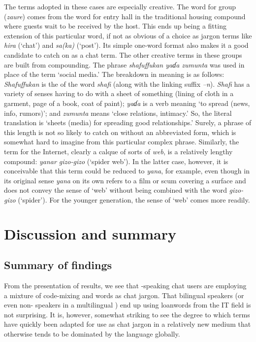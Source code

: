 \documentclass[output=paper,newtxmath,modfonts,nonflat,hidelinks]{langsci/langscibook}
\begin{document}
The  terms adopted in these cases are especially creative. The word for group (\textit{zaure}) comes from the word for entry hall in the traditional  housing compound where guests wait to be received by the host. This ends up being a fitting extension of this particular word, if not as obvious of a choice as jargon terms like \textit{hira} (‘chat’) and \textit{sa(ka)} (‘post’). Its simple one-word format also makes it a good candidate to catch on as a chat term. The other creative  terms in these groups are built from compounding. The phrase \textit{shafuffukan yaɗa zumunta} was used in place of the term ‘social media.’ The breakdown in meaning is as follows: \textit{Shafuffukan} is the  of the word \textit{shafi} (along with the linking suffix \textit{–n}). \textit{Shafi} has a variety of senses having to do with a sheet of something (lining of cloth in a garment, page of a book, coat of paint); \textit{yaɗa} is a verb meaning ‘to spread (news, info, rumors)’; and \textit{zumunta} means ‘close relations, intimacy.’ So, the literal translation is ‘sheets (media) for spreading good relationships.’ Surely, a phrase of this length is not so likely to catch on without an abbreviated form, which is somewhat hard to imagine from this particular complex phrase. Similarly, the term for the Internet, clearly a calque of sorts of  \textit{web}, is a relatively lengthy compound: \textit{yanar gizo-gizo} (‘spider web’). In the latter case, however, it is conceivable that this term could be reduced to \textit{yana}, for example, even though in its original sense \textit{yana} on its own refers to a film or scum covering a surface and does not convey the sense of ‘web’ without being combined with the word \textit{gizo-gizo} (‘spider’). For the younger generation, the sense of ‘web’ comes more readily. 

\section{Discussion and summary}
\subsection{Summary of findings}

From the presentation of results, we see that -speaking chat users are employing a mixture of  code-mixing and  words as chat jargon. That bilingual speakers (or even non- speakers in a multilingual ) end up using  loanwords from the IT field is not surprising. It is, however, somewhat striking to see the degree to which  terms have quickly been adapted for use as chat jargon in a relatively new medium that otherwise tends to be dominated by the  language globally. 
\end{document}
